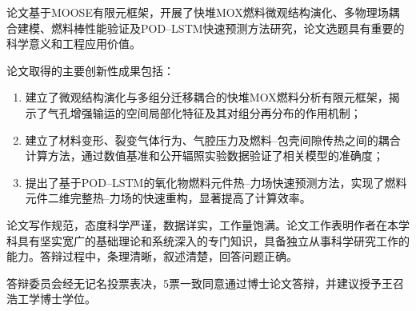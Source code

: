 论文基于MOOSE有限元框架，开展了快堆MOX燃料微观结构演化、多物理场耦合建模、燃料棒性能验证及POD–LSTM快速预测方法研究，论文选题具有重要的科学意义和工程应用价值。

论文取得的主要创新性成果包括：

\begin{enumerate}[wide]
    \item 建立了微观结构演化与多组分迁移耦合的快堆MOX燃料分析有限元框架，揭示了气孔增强输运的空间局部化特征及其对组分再分布的作用机制；
    \item 建立了材料变形、裂变气体行为、气腔压力及燃料–包壳间隙传热之间的耦合计算方法，通过数值基准和公开辐照实验数据验证了相关模型的准确度；
    \item 提出了基于POD–LSTM的氧化物燃料元件热–力场快速预测方法，实现了燃料元件二维完整热–力场的快速重构，显著提高了计算效率。
\end{enumerate}

论文写作规范，态度科学严谨，数据详实，工作量饱满。论文工作表明作者在本学科具有坚实宽广的基础理论和系统深入的专门知识，具备独立从事科学研究工作的能力。答辩过程中，条理清晰，叙述清楚，回答问题正确。

答辩委员会经无记名投票表决，5票一致同意通过博士论文答辩，并建议授予王召浩工学博士学位。
